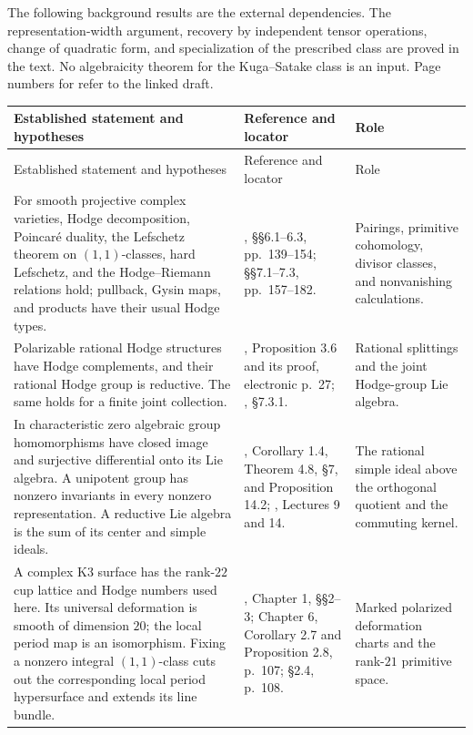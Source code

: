 The following background results are the external dependencies.  The
representation-width argument, recovery by independent tensor operations,
change of quadratic form, and specialization of the prescribed class are
proved in the text.  No algebraicity theorem for the Kuga--Satake class is
an input.  Page numbers for \cite{Huybrechts} refer to the linked draft.

\begingroup
\small
\setlength{\tabcolsep}{5pt}
\renewcommand{\arraystretch}{1.13}
\begin{longtable}{@{}>{\raggedright\arraybackslash}p{}>{\raggedright\arraybackslash}p{}>{\raggedright\arraybackslash}p{}@{}}
\toprule
Established statement and hypotheses & Reference and locator & Role \\
\midrule
\endfirsthead
\toprule
Established statement and hypotheses & Reference and locator & Role \\
\midrule
\endhead
\bottomrule
\endfoot

For smooth projective complex varieties, Hodge decomposition, Poincar\'e
duality, the Lefschetz theorem on $(1,1)$-classes, hard Lefschetz, and the
Hodge--Riemann relations hold; pullback, Gysin maps, and products have their
usual Hodge types. &
\cite{Voisin}, \S\S6.1--6.3, pp.~139--154;
\S\S7.1--7.3, pp.~157--182. &
Pairings, primitive cohomology, divisor classes, and nonvanishing
calculations. \\[3pt]

Polarizable rational Hodge structures have Hodge complements, and their
rational Hodge group is reductive.  The same
holds for a finite joint collection. &
\cite{Deligne}, Proposition 3.6 and its proof, electronic p.~27;
\cite{Voisin}, \S7.3.1. &
Rational splittings and the joint Hodge-group Lie algebra. \\[3pt]

In characteristic zero algebraic group homomorphisms have closed image
and surjective differential onto its Lie algebra.  A unipotent group has
nonzero invariants in every nonzero representation.  A reductive Lie
algebra is the sum of its center and simple ideals. &
\cite{Borel}, Corollary 1.4, Theorem 4.8, \S7,
and Proposition 14.2;
\cite{FultonHarris}, Lectures 9 and 14. &
The rational simple ideal above the orthogonal quotient and the
commuting kernel. \\[3pt]

A complex K3 surface has the rank-$22$ cup lattice and Hodge numbers used
here.  Its universal deformation is smooth of dimension $20$; the local
period map is an isomorphism.  Fixing a nonzero integral $(1,1)$-class
cuts out the corresponding local period hypersurface and extends its
line bundle. &
\cite{Huybrechts}, Chapter 1, \S\S2--3;
Chapter 6, Corollary 2.7 and Proposition 2.8, p.~107;
\S2.4, p.~108. &
Marked polarized deformation charts and the rank-$21$ primitive space. \\[3pt]


\end{longtable}
